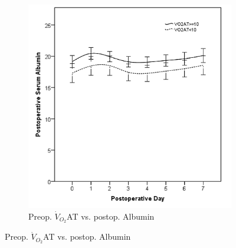 \begin{figure}[p]
\begin{subfigure}{0.48\textwidth}
		\includegraphics[width=\textwidth]{Figures/sirs_at_alb}
		\caption{Preop. $\dot{V}_{O_2}$AT vs. postop. Albumin}
		\label{fig:sirs_at_alb}
	\end{subfigure}
	

\end{figure}
